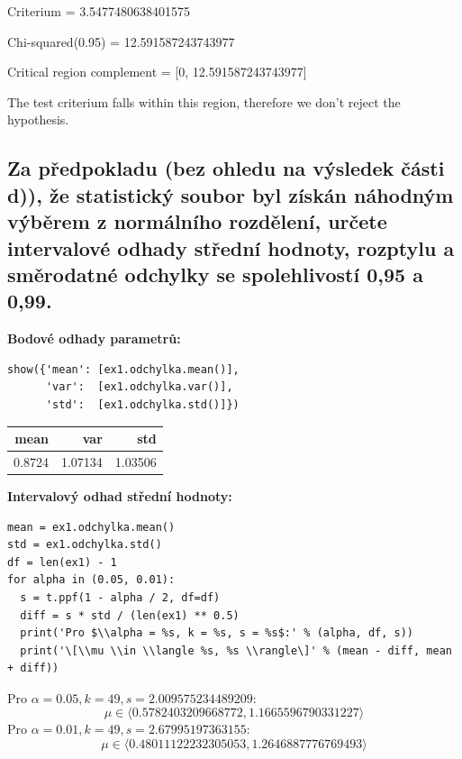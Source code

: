 \documentclass[11pt,titlepage]{article}
\begin{document}
Criterium = 3.5477480638401575

Chi-squared(0.95) = 12.591587243743977

Critical region complement = [0, 12.591587243743977]

The test criterium falls within this region, therefore we don't reject the hypothesis.
\newpage

\subsection{Za předpokladu (bez ohledu na výsledek části d)), že statistický soubor byl získán náhodným výběrem z normálního rozdělení, určete intervalové odhady střední hodnoty, rozptylu a směrodatné odchylky se spolehlivostí 0,95 a 0,99.}
\label{sec:org56cf8a5}

\textbf{Bodové odhady parametrů:}
\begin{listing}[htbp]
\begin{verbatim}
show({'mean': [ex1.odchylka.mean()],
      'var':  [ex1.odchylka.var()],
      'std':  [ex1.odchylka.std()]})
\end{verbatim}
\end{listing}

\begin{center}
\begin{tabular}{rrr}
mean & var & std\\
\hline
0.8724 & 1.07134 & 1.03506\\
\end{tabular}
\end{center}

\textbf{Intervalový odhad střední hodnoty:}
\begin{listing}[htbp]
\begin{verbatim}
mean = ex1.odchylka.mean()
std = ex1.odchylka.std()
df = len(ex1) - 1
for alpha in (0.05, 0.01):
  s = t.ppf(1 - alpha / 2, df=df)
  diff = s * std / (len(ex1) ** 0.5)
  print('Pro $\\alpha = %s, k = %s, s = %s$:' % (alpha, df, s))
  print('\[\\mu \\in \\langle %s, %s \\rangle\]' % (mean - diff, mean + diff))
\end{verbatim}
\end{listing}

Pro \(\alpha = 0.05, k = 49, s = 2.009575234489209\):
\[\mu \in \langle 0.5782403209668772, 1.1665596790331227 \rangle\]
Pro \(\alpha = 0.01, k = 49, s = 2.67995197363155\):
\[\mu \in \langle 0.48011122232305053, 1.2646887776769493 \rangle\]
\end{document}
